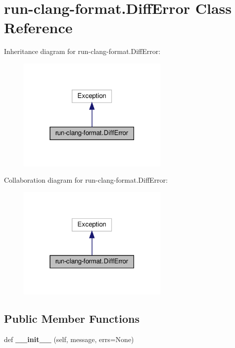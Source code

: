 \hypertarget{classrun-clang-format_1_1DiffError}{}\section{run-\/clang-\/format.Diff\+Error Class Reference}
\label{classrun-clang-format_1_1DiffError}


Inheritance diagram for run-\/clang-\/format.Diff\+Error\+:
\nopagebreak
\begin{figure}[H]
\begin{center}
\leavevmode
\includegraphics[width=207pt]{classrun-clang-format_1_1DiffError__inherit__graph}
\end{center}
\end{figure}


Collaboration diagram for run-\/clang-\/format.Diff\+Error\+:
\nopagebreak
\begin{figure}[H]
\begin{center}
\leavevmode
\includegraphics[width=207pt]{classrun-clang-format_1_1DiffError__coll__graph}
\end{center}
\end{figure}
\subsection*{Public Member Functions}
\begin{DoxyCompactItemize}
\item 
\mbox{\label{classrun-clang-format_1_1DiffError_ac22cfa574f8b8d3067be6e39d1de2399}} 
def {\bfseries \+\_\+\+\_\+init\+\_\+\+\_\+} (self, message, errs=None)
\end{DoxyCompactItemize}
